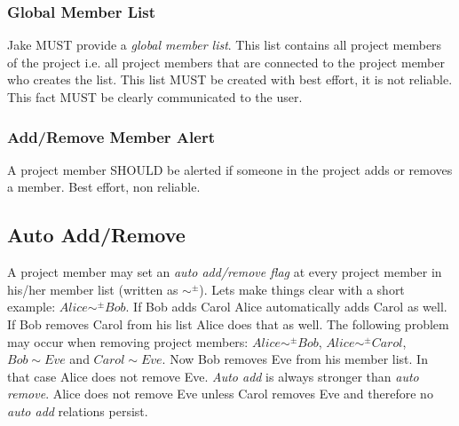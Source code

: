 \subsubsection{Global Member List}
Jake MUST provide a \emph{global member list}. This list contains all project members of the project i.e. all project members that are connected to the project member who creates the list. This list MUST be created with best effort, it is not reliable. This fact MUST be clearly communicated to the user. 

\subsubsection{Add/Remove Member Alert}
A project member SHOULD be alerted if someone in the project adds or removes a member. Best effort, non reliable. 

\subsection{Auto Add/Remove}
A project member may set an \emph{auto add/remove flag} at every project member in his/her member list (written as $\sim ^\pm$). Lets make things clear with a short example: $Alice \sim ^\pm Bob$. If Bob adds Carol Alice automatically adds Carol as well. If Bob removes Carol from his list Alice does that as well. The following problem may occur when removing project members: $Alice \sim ^\pm Bob$, $Alice \sim ^\pm  Carol$, $Bob \sim Eve$ and $Carol \sim Eve$. Now Bob removes Eve from his member list. In that case Alice does not remove Eve. 
\emph{Auto add} is always stronger than \emph{auto remove}. Alice does not remove Eve unless Carol removes Eve and therefore no \emph{auto add} relations persist. 

